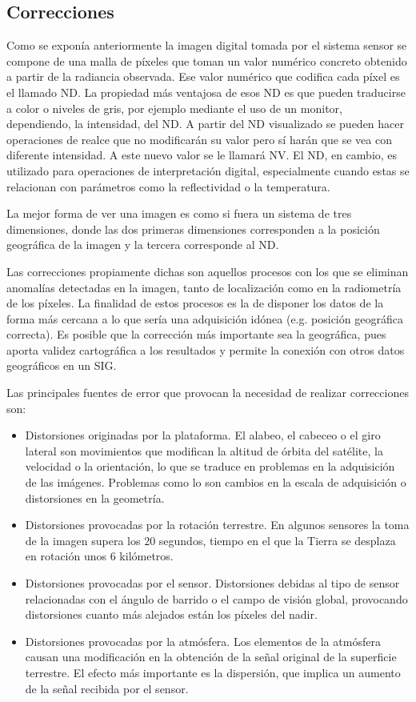 \subsection{Correcciones}
Como se exponía anteriormente la imagen digital tomada por el sistema sensor se compone de una malla de píxeles que toman un valor numérico concreto obtenido a partir de la radiancia observada. Ese valor numérico que codifica cada píxel es el llamado \ac{ND}. La propiedad más ventajosa de esos \ac{ND} es que pueden traducirse a color o niveles de gris, por ejemplo mediante el uso de un monitor, dependiendo, la intensidad, del \ac{ND}. A partir del \ac{ND} visualizado se pueden hacer operaciones de realce que no modificarán su valor pero sí harán que se vea con diferente intensidad. A este nuevo valor se le llamará \ac{NV}. El \ac{ND}, en cambio, es utilizado para operaciones de interpretación digital, especialmente cuando estas se relacionan con parámetros como la reflectividad o la temperatura.%

La mejor forma de ver una imagen es como si fuera un sistema de tres dimensiones, donde las dos primeras dimensiones corresponden a la posición geográfica de la imagen y la tercera corresponde al \ac{ND}.%

Las correcciones propiamente dichas son aquellos procesos con los que se eliminan anomalías detectadas en la imagen, tanto de localización como en la radiometría de los píxeles. La finalidad de estos procesos es la de disponer los datos de la forma más cercana a lo que sería una adquisición idónea (e.g. posición geográfica correcta). Es posible que la corrección más importante sea la geográfica, pues aporta validez cartográfica a los resultados y permite la conexión con otros datos geográficos en un \ac{SIG}.%

Las principales fuentes de error que provocan la necesidad de realizar correcciones son:
\begin{itemize}
	\item Distorsiones originadas por la plataforma. El alabeo, el cabeceo o el giro lateral son movimientos que modifican la altitud de órbita del satélite, la velocidad o la orientación, lo que se traduce en problemas en la adquisición de las imágenes. Problemas como lo son cambios en la escala de adquisición o distorsiones en la geometría.
	\item Distorsiones provocadas por la rotación terrestre. En algunos sensores la toma de la imagen supera los 20 segundos, tiempo en el que la Tierra se desplaza en rotación unos 6 kilómetros.
	\item Distorsiones provocadas por el sensor. Distorsiones debidas al tipo de sensor relacionadas con el ángulo de barrido o el campo de visión global, provocando distorsiones cuanto más alejados están los píxeles del nadir.
	\item Distorsiones provocadas por la atmósfera. Los elementos de la atmósfera causan una modificación en la obtención de la señal original de la superficie terrestre. El efecto más importante es la dispersión, que implica un aumento de la señal recibida por el sensor.
\end{itemize}

